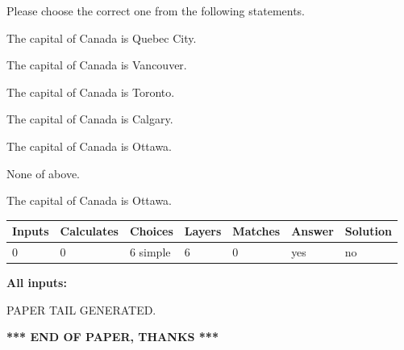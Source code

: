 \documentclass[12pt]{article}
\begin{document}
  
Please choose the correct one from the following statements.
 
 
The capital of Canada is Quebec City.
 
 
The capital of Canada is Vancouver.
 
 
The capital of Canada is Toronto.
 
 
The capital of Canada is Calgary.
 
 
The capital of Canada is Ottawa.
 
 
 None of above.
 
 
\noindent{}
 
 
The capital of Canada is Ottawa.
 
 
\noindent{}
 
 
   
   
   
   
\noindent\begin{tabular}{|l|l|l|l|l|l|l|}
 \hline
Inputs & Calculates & Choices & Layers & Matches & Answer & Solution \\ \hline
 0  & 
 0  & 
 6
  simple  
  & 
 6  & 
 0  & 
  yes & 
  no 
  \\ \hline
 \end{tabular}
   
   
   
   
\noindent{}
   
   
   
   
\noindent\vspace{0.1in}\hspace{-0.08in} {\textbf{\Large{All inputs: }}}
   
   
   
   
   
   
 \vspace{0.2in}
 
   
   
\vspace{2.0in} PAPER TAIL GENERATED.
   
   
   
   
\vspace{1.0in} 
{\textbf{\large{ *** END OF PAPER, THANKS *** }}} 
   
\end{document}
